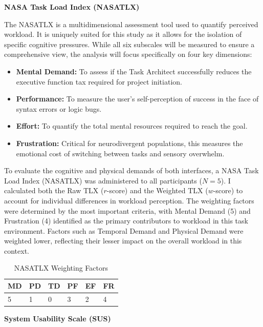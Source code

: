 \textbf{NASA Task Load Index (\gls{NASATLX})}


The \gls{NASATLX} is a multidimensional assessment tool used to quantify perceived workload. It is uniquely suited for this study as it allows for the isolation of specific cognitive pressures. While all six subscales will be measured to ensure a comprehensive view, the analysis will focus specifically on four key dimensions:

\begin{itemize}
    \item \textbf{Mental Demand:} To assess if the Task Architect successfully reduces the executive function tax required for project initiation.
    \item \textbf{Performance:} To measure the user's self-perception of success in the face of syntax errors or logic bugs.
    \item \textbf{Effort:} To quantify the total mental resources required to reach the goal.
    \item \textbf{Frustration:} Critical for \gls{neurodivergent} populations, this measures the emotional cost of switching between tasks and sensory overwhelm.
\end{itemize}

To evaluate the cognitive and physical demands of both interfaces, a NASA Task Load Index (\gls{NASATLX}) was administered to all participants ($N=5$).
I calculated both the Raw TLX ($r$-score) and the Weighted TLX ($w$-score) to account for individual differences in workload perception. 
The weighting factors were determined by the most important criteria, with Mental Demand (5) and Frustration (4) identified as the primary contributors to workload 
 in this task environment. Factors such as Temporal Demand and Physical Demand were weighted lower, reflecting their lesser impact on the overall workload in this context.

\begin{table}[h]
\centering
\caption{\gls{NASATLX} Weighting Factors}
\begin{tabular}{@{}p{1cm}p{1cm}p{1cm}p{1cm}p{1cm}p{1cm}@{}} %
\toprule
\textbf{MD} & \textbf{PD} & \textbf{TD} & \textbf{PF} & \textbf{EF} & \textbf{FR} \\ \midrule
5           & 1           & 0           & 3           & 2           & 4           \\ \bottomrule
\end{tabular}
\end{table}
\textbf{System Usability Scale (\gls{SUS})}


